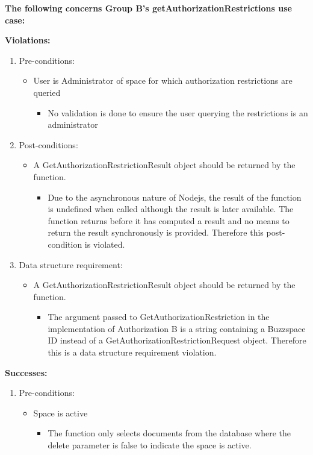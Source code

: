 

\textbf{The following concerns Group B's getAuthorizationRestrictions use case:}\newline


\textbf{Violations:}
\begin{enumerate}
	\item Pre-conditions:	
	\begin{itemize}
		\item User is Administrator of space for which authorization restrictions are queried
		\begin{itemize}
				\item No validation is done to ensure the user querying the restrictions is an administrator
		\end{itemize}
	\end{itemize}
	
	\item Post-conditions:
	\begin{itemize}
		\item  A GetAuthorizationRestrictionResult object should be returned by the function. 
		\begin{itemize}
				\item Due to the asynchronous nature of Nodejs, the result of the function is undefined when called although the result is later available. The function returns before it has computed a result and no means to return the result synchronously is provided. Therefore this post-condition is violated.
		\end{itemize}
	\end{itemize}
	
	\item Data structure requirement:
	\begin{itemize}
		\item  A GetAuthorizationRestrictionResult object should be returned by the function. 
		\begin{itemize}
				\item The argument passed to GetAuthorizationRestriction in the implementation of Authorization B is a string containing a Buzzspace ID instead of a GetAuthorizationRestrictionRequest object. Therefore this is a data structure requirement violation.
		\end{itemize}
	\end{itemize}
		
\end{enumerate}

\textbf{Successes:}
\begin{enumerate}
	\item Pre-conditions:	
	\begin{itemize}
		\item Space is active
		\begin{itemize}
				\item The function only selects documents from the database where the delete parameter is false to indicate the space is active.
		\end{itemize}
	\end{itemize}	
\end{enumerate}


